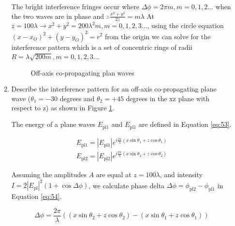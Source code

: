 \documentclass[main.tex]{subfiles}
\begin{document}
\begin{enumerate}
\begin{enumerate}
The bright interference fringes occur where $\Delta \phi=2 \pi m, m=0,1,2 \ldots$ when the two waves are in phase and $\therefore  \frac{x^{2}+y^{2}}{2 z}=m \lambda$  At $z=100 \lambda \rightarrow x^{2}+y^{2}=200 \lambda^{2} m, m=0,1,2,3 \ldots $, using the circle equation $(x-x_{O})^{2}+(y-y_{O})^{2}=r^2$ from the origin we can solve for the interference pattern which is a set of concentric rings of radii $R=\lambda \sqrt{200 m}, m=0,1,2,3 \ldots$

\begin{figure}
\centering{}
\caption{Off-axis co-propagating plan waves}
\label{fig:52}
\end{figure}

\item{Describe the interference pattern for an off-axis co-propagating plane wave ($\theta_1 = -30$ degrees and $\theta_2 = +45$ degrees in the xz plane with respect to z) as shown in Figure \ref{fig:52}.}

The energy of a plane waves $E_{\mathrm{pl1}}$ and $E_{\mathrm{pl1}}$ are defined in Equation \ref{eq:53}.

\begin{equation}\label{eq:53}
\begin{array}{l}
{E_{\mathrm{pl1}}=\left|E_{\mathrm{pl1}}\right| e^{i \frac{2 \pi}{\lambda}(x \sin \theta_1+z \cos \theta_1)}}\\
{E_{\mathrm{pl2}}=\left|E_{\mathrm{pl2}}\right| e^{i \frac{2 \pi}{\lambda}(x \sin \theta_2+z \cos \theta_2)}}
\end{array}
\end{equation}

Assuming the amplitudes $A$ are equal at $z=100\lambda$, and intensity $I=2\left|E_{\mathrm{pl}}\right|^{2}(1+\cos \Delta \phi)$, we calculate phase delta $\Delta \phi=\phi_{\mathrm{pl2}}-\phi_{\mathrm{pl1}}$ in Equation \ref{eq:54}.

\begin{equation}\label{eq:54}
\Delta \phi= \frac{2 \pi}{\lambda} \left((x \sin \theta_2+z \cos \theta_2) - (x \sin \theta_1+z \cos \theta_1) \right)
\end{equation}


\end{enumerate}
\end{enumerate}
\end{document}
